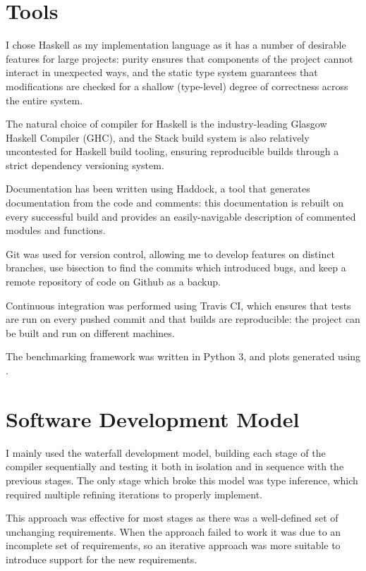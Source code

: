 \documentclass[dissertation.tex]{subfiles}
\begin{document}
\section{Tools}
{

    I chose Haskell as my implementation language as it has a number of desirable features for large projects: purity
    ensures that components of the project cannot interact in unexpected ways, and the static type system guarantees
    that modifications are checked for a shallow (type-level) degree of correctness across the entire system.

    The natural choice of compiler for Haskell is the industry-leading Glasgow Haskell Compiler (GHC), and the Stack
    build system is also relatively uncontested for Haskell build tooling, ensuring reproducible builds through a strict
    dependency versioning system.

    Documentation has been written using Haddock, a tool that generates documentation from the code and comments: this
    documentation is rebuilt on every successful build and provides an easily-navigable description of commented modules
    and functions.

    Git was used for version control, allowing me to develop features on distinct branches, use bisection to find the
    commits which introduced bugs, and keep a remote repository of code on Github as a backup.

    Continuous integration was performed using Travis CI, which ensures that tests are run on every pushed commit and
    that builds are reproducible: the project can be built and run on different machines.

    The benchmarking framework was written in Python 3, and plots generated using .

}
\section{Software Development Model}
{

    I mainly used the waterfall development model, building each stage of the compiler sequentially and testing it both
    in isolation and in sequence with the previous stages. The only stage which broke this model was type inference,
    which required multiple refining iterations to properly implement.

    This approach was effective for most stages as there was a well-defined set of unchanging requirements. When the
    approach failed to work it was due to an incomplete set of requirements, so an iterative approach was more suitable
    to introduce support for the new requirements.

}
\end{document}
